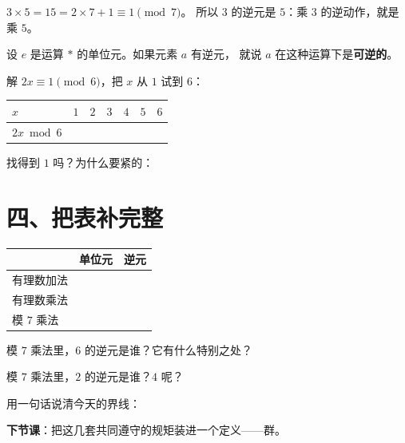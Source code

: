 \begin{example}
  \(3\times5=15=2\times7+1\equiv1\pmod7\)。
  所以 \(3\) 的逆元是 \(5\)：乘 \(3\) 的逆动作，就是乘 \(5\)。
\end{example}

\begin{definition}[可逆]
  设 \(e\) 是运算 \(*\) 的单位元。如果元素 \(a\) 有逆元，
  就说 \(a\) 在这种运算下是\textbf{可逆的}。
\end{definition}

\begin{dongshou}[再换一个：模 6]
  解 \(2x\equiv1\pmod6\)，把 \(x\) 从 \(1\) 试到 \(6\)：
  \begin{center}
  \begin{tabular}{@{}lcccccc@{}}
    \toprule
    \(x\) & \(1\) & \(2\) & \(3\) & \(4\) & \(5\) & \(6\) \\
    \midrule
    \(2x \bmod 6\) & \hspace{1.2em} & \hspace{1.2em} & \hspace{1.2em} & \hspace{1.2em} & \hspace{1.2em} & \hspace{1.2em} \\
    \bottomrule
  \end{tabular}
  \end{center}
  找得到 \(1\) 吗？\underline{\hspace{3em}}\quad 为什么要紧的：
\end{dongshou}

\section*{四、把表补完整}

\begin{example}
  \begin{center}
  \begin{tabular}{@{}lcc@{}}
    \toprule
     & \textbf{单位元} & \textbf{逆元} \\
    \midrule
    有理数加法 & \hspace{1.6em} & \hspace{3.6em} \\
    有理数乘法 & \hspace{1.6em} & \hspace{3.6em} \\
    模 \(7\) 乘法 & \hspace{1.6em} & \hspace{3.6em} \\
    \bottomrule
  \end{tabular}
  \end{center}
\end{example}

\begin{sikao}
  模 \(7\) 乘法里，\(6\) 的逆元是谁？它有什么特别之处？
\end{sikao}

\begin{sikao}
  模 \(7\) 乘法里，\(2\) 的逆元是谁？\(4\) 呢？
\end{sikao}

\begin{xiaojie}
  用一句话说清今天的界线：
\end{xiaojie}

\noindent\textbf{下节课}：把这几套共同遵守的规矩装进一个定义——群。